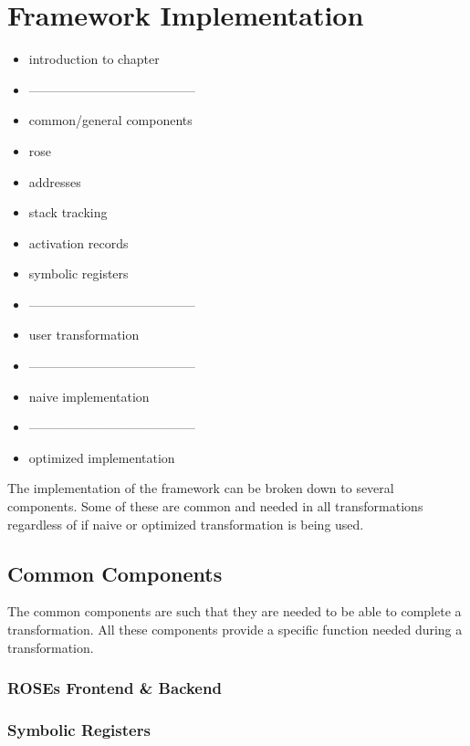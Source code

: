 \chapter{Framework Implementation}

\begin{itemize}
    \item introduction to chapter
    \item ---------------------------------------
    \item common/general components
    \item rose
    \item addresses
    \item stack tracking
    \item activation records
    \item symbolic registers
    \item ---------------------------------------
    \item user transformation
    \item ---------------------------------------
    \item naive implementation
    \item ---------------------------------------
    \item optimized implementation
\end{itemize}


The implementation of the framework can be broken down to several components.
Some of these are common and needed in all transformations regardless
of if naive or optimized transformation is being used.

\section{Common Components}
The common components are such that they are needed to be able
to complete a transformation. All these components provide a
specific function needed during a transformation.

\subsection{ROSEs Frontend \& Backend}

\subsection{Symbolic Registers}



